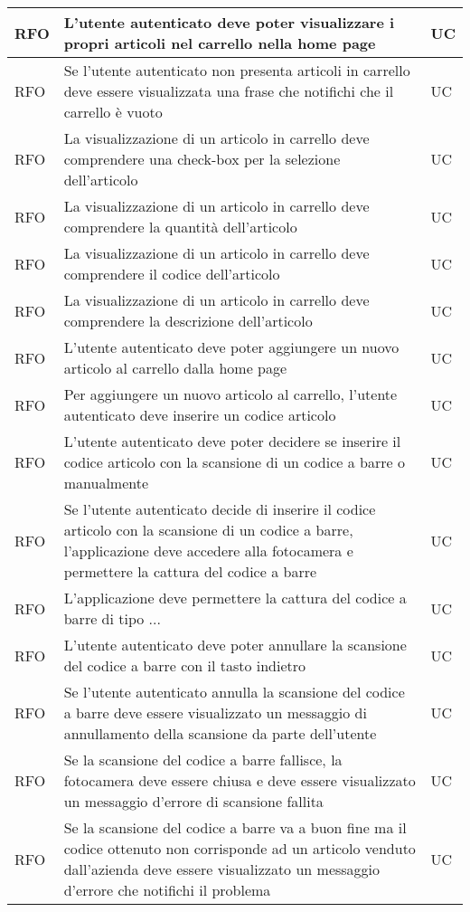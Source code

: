 \begin{center}
\begin{longtable}{ | >{\centering\arraybackslash}m{2.5cm} | >{\centering\arraybackslash}m{8cm} | >{\centering\arraybackslash}m{2.5cm} | }
RFO & L'utente autenticato deve poter visualizzare i propri articoli nel carrello nella home page & UC \\ \hline
RFO & Se l'utente autenticato non presenta articoli in carrello deve essere visualizzata una frase che notifichi che il carrello è vuoto & UC \\ \hline
RFO & La visualizzazione di un articolo in carrello deve comprendere una check-box per la selezione dell'articolo & UC \\ \hline
RFO & La visualizzazione di un articolo in carrello deve comprendere la quantità dell'articolo & UC \\ \hline
RFO & La visualizzazione di un articolo in carrello deve comprendere il codice dell'articolo & UC \\ \hline
RFO & La visualizzazione di un articolo in carrello deve comprendere la descrizione dell'articolo & UC \\ \hline
RFO & L'utente autenticato deve poter aggiungere un nuovo articolo al carrello dalla home page & UC \\ \hline
RFO & Per aggiungere un nuovo articolo al carrello, l'utente autenticato deve inserire un codice articolo & UC \\ \hline
RFO & L'utente autenticato deve poter decidere se inserire il codice articolo con la scansione di un codice a barre o manualmente & UC \\ \hline
RFO & Se l'utente autenticato decide di inserire il codice articolo con la scansione di un codice a barre, l'applicazione deve accedere alla fotocamera e permettere la cattura del codice a barre & UC \\ \hline
RFO & L'applicazione deve permettere la cattura del codice a barre di tipo ... & UC \\ \hline
RFO & L'utente autenticato deve poter annullare la scansione del codice a barre con il tasto indietro & UC \\ \hline
RFO & Se l'utente autenticato annulla la scansione del codice a barre deve essere visualizzato un messaggio di annullamento della scansione da parte dell'utente & UC \\ \hline
RFO & Se la scansione del codice a barre fallisce, la fotocamera deve essere chiusa e deve essere visualizzato un messaggio d'errore di scansione fallita & UC \\ \hline
RFO & Se la scansione del codice a barre va a buon fine ma il codice ottenuto non corrisponde ad un articolo venduto dall'azienda deve essere visualizzato un messaggio d'errore che notifichi il problema & UC \\ \hline

\end{longtable}
\end{center}
